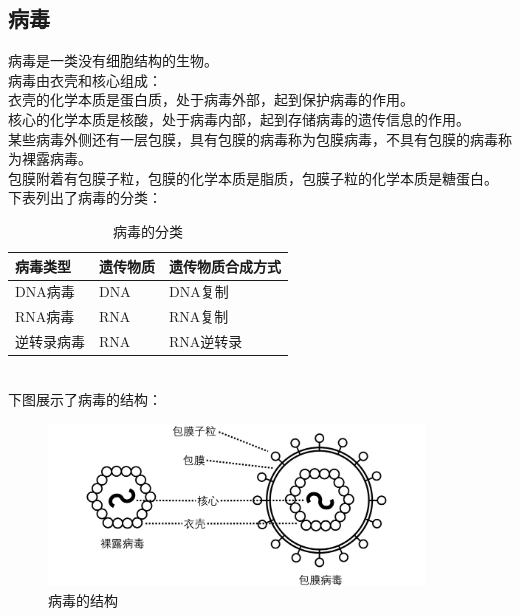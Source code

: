 \documentclass[UTF8]{ctexart}
\begin{document}
\newpage

\subsection{病毒}
    病毒是一类没有细胞结构的生物。\\[6mm]
    病毒由衣壳和核心组成：\\[3mm]
    衣壳的化学本质是蛋白质，处于病毒外部，起到保护病毒的作用。\\[3mm]
    核心的化学本质是核酸，处于病毒内部，起到存储病毒的遗传信息的作用。\\[6mm]
    某些病毒外侧还有一层包膜，具有包膜的病毒称为包膜病毒，不具有包膜的病毒称为裸露病毒。\\[3mm]
    包膜附着有包膜子粒，包膜的化学本质是脂质，包膜子粒的化学本质是糖蛋白。\\[6mm]
    下表列出了病毒的分类：\vspace{3pt}
    \begin{table}[h]
        \begin{center}
            \begin{tabular}{l|l|l}
                \hline
                病毒类型\qquad\qquad&遗传物质\qquad\qquad&遗传物质合成方式\qquad\qquad\\ \hline
                DNA病毒&DNA&DNA复制\\ \hline
                RNA病毒&RNA&RNA复制\\ \hline
                逆转录病毒&RNA&RNA逆转录\\ \hline
            \end{tabular}
            \caption{病毒的分类}
        \end{center}
    \end{table}\\
    下图展示了病毒的结构：
    \begin{figure}[h]
        \begin{center}
            \includegraphics[width=10cm]{BiologyImage/50.jpg}
            \caption{病毒的结构}
        \end{center}
    \end{figure}\\
\end{document}
